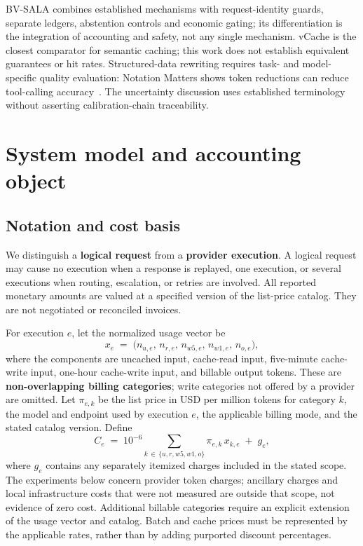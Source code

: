 \documentclass[11pt,a4paper]{article}
\begin{document}
BV-SALA combines established mechanisms with request-identity guards, separate ledgers,
abstention controls and economic gating; its differentiation is the integration of accounting and
safety, not any single mechanism. vCache is the closest comparator for semantic caching; this
work does not establish equivalent guarantees or hit rates. Structured-data rewriting requires
task- and model-specific quality evaluation: Notation Matters shows token reductions can reduce
tool-calling accuracy~\cite{notation}. The uncertainty discussion uses established
terminology~\cite{jcgm100,jcgm200} without asserting calibration-chain traceability.

\section{System model and accounting object}\label{sec:model}

\subsection{Notation and cost basis}
We distinguish a \textbf{logical request} from a \textbf{provider execution}. A logical request may
cause no execution when a response is replayed, one execution, or several executions when
routing, escalation, or retries are involved. All reported monetary amounts are valued at a
specified version of the list-price catalog. They are not negotiated or reconciled invoices.

For execution $e$, let the normalized usage vector be
\begin{equation}
x_e \;=\; \bigl(n_{u,e},\, n_{r,e},\, n_{w5,e},\, n_{w1,e},\, n_{o,e}\bigr),
\end{equation}
where the components are uncached input, cache-read input, five-minute cache-write input,
one-hour cache-write input, and billable output tokens. These are \textbf{non-overlapping
billing categories}; write categories not offered by a provider are omitted. Let $\pi_{e,k}$ be
the list price in USD per million tokens for category $k$, the model and endpoint used by
execution $e$, the applicable billing mode, and the stated catalog version. Define
\begin{equation}
C_e \;=\; 10^{-6}\!\sum_{k\,\in\,\{u,r,w5,w1,o\}} \pi_{e,k}\, x_{k,e} \;+\; g_e,
\label{eq:coste}
\end{equation}
where $g_e$ contains any separately itemized charges included in the stated scope. The
experiments below concern provider token charges; ancillary charges and local infrastructure
costs that were not measured are outside that scope, not evidence of zero cost. Additional
billable categories require an explicit extension of the usage vector and catalog. Batch and
cache prices must be represented by the applicable rates, rather than by adding purported
discount percentages.
\end{document}
